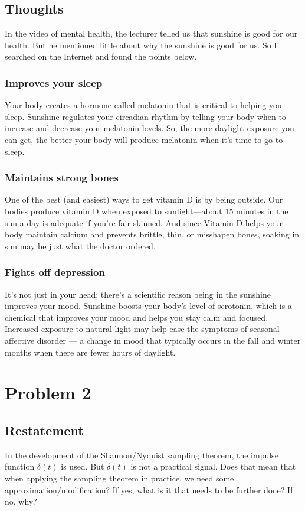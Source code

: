 \documentclass{article}
\begin{document}
\subsection{Thoughts}

In the video of mental health, the lecturer telled us that sunshine is good for our health. But he mentioned little about why the sunshine is good for us. So I searched on the Internet and found the points below.

\subsubsection*{Improves your sleep}

Your body creates a hormone called melatonin that is critical to helping you sleep. Sunshine regulates your circadian rhythm by telling your body when to increase and decrease your melatonin levels. So, the more daylight exposure you can get, the better your body will produce melatonin when it’s time to go to sleep.

\subsubsection*{Maintains strong bones}
One of the best (and easiest) ways to get vitamin D is by being outside. Our bodies produce vitamin D when exposed to sunlight—about 15 minutes in the sun a day is adequate if you’re fair skinned. And since Vitamin D helps your body maintain calcium and prevents brittle, thin, or misshapen bones, soaking in sun may be just what the doctor ordered.

\subsubsection*{Fights off depression}
It’s not just in your head; there’s a scientific reason being in the sunshine improves your mood. Sunshine boosts your body’s level of serotonin, which is a chemical that improves your mood and helps you stay calm and focused. Increased exposure to natural light may help ease the symptoms of seasonal affective disorder --- a change in mood that typically occurs in the fall and winter months when there are fewer hours of daylight.


\section{Problem 2}

\subsection{Restatement}
In the development of the Shannon/Nyquist sampling theorem, the impulse function $\delta (t)$ is used. But $\delta (t)$ is not a practical signal. Does that mean that when applying the sampling theorem in practice, we need some approximation/modification? If yes, what is it that needs to be further done? If no, why?
\end{document}
